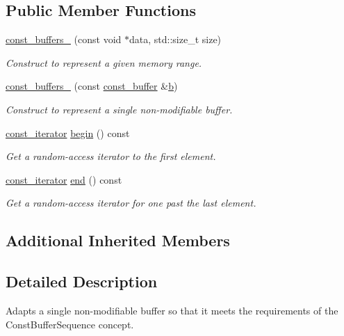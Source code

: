 \subsection*{Public Member Functions}
\begin{DoxyCompactItemize}
\item 
\hyperlink{classasio_1_1const__buffers__1_a87113aa988e30be0a4e8a384400bf1aa}{const\+\_\+buffers\+\_} (const void $\ast$data, std\+::size\+\_\+t size)
\begin{DoxyCompactList}\small\item\em Construct to represent a given memory range. \end{DoxyCompactList}\item 
\hyperlink{classasio_1_1const__buffers__1_a457eb3c4c3d4658581e4d3d3af099084}{const\+\_\+buffers\+\_} (const \hyperlink{classasio_1_1const__buffer}{const\+\_\+buffer} \&\hyperlink{group__async__read_ga945a5c18fa77a9e2eba420f8f44b2a4f}{b})
\begin{DoxyCompactList}\small\item\em Construct to represent a single non-\/modifiable buffer. \end{DoxyCompactList}\item 
\hyperlink{classasio_1_1const__buffers__1_af82877a0ca877a65af2e4c0990c854b4}{const\+\_\+iterator} \hyperlink{classasio_1_1const__buffers__1_a5a38d306b419b87a832a3b38996a4a6f}{begin} () const 
\begin{DoxyCompactList}\small\item\em Get a random-\/access iterator to the first element. \end{DoxyCompactList}\item 
\hyperlink{classasio_1_1const__buffers__1_af82877a0ca877a65af2e4c0990c854b4}{const\+\_\+iterator} \hyperlink{classasio_1_1const__buffers__1_a3de1cb3ecba6f893100c9a100c0648d2}{end} () const 
\begin{DoxyCompactList}\small\item\em Get a random-\/access iterator for one past the last element. \end{DoxyCompactList}\end{DoxyCompactItemize}
\subsection*{Additional Inherited Members}


\subsection{Detailed Description}
Adapts a single non-\/modifiable buffer so that it meets the requirements of the Const\+Buffer\+Sequence concept. 

